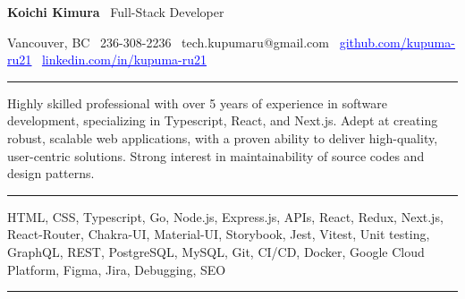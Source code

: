 \documentclass{article}
\newcommand{\link}[2]{\href{#1}{\textcolor{blue}{\uline{#2}}}}
\begin{document}
\begin{center}
    {\LARGE \textbf{Koichi Kimura} \textbar\ \LARGE Full-Stack Developer}
\end{center}
\begin{center}
    Vancouver, BC \textbar\ 236-308-2236 \textbar\ tech.kupumaru@gmail.com \textbar\
    \link{https://github.com/kupuma-ru21}{github.com/kupuma-ru21} \textbar\
    \link{https://www.linkedin.com/in/kupuma-ru21}{linkedin.com/in/kupuma-ru21}
\end{center}

\par
\vspace{-1em}
\noindent\rule{\textwidth}{0.1pt}
\noindent
Highly skilled professional with over 5 years of experience in software development, specializing in Typescript, React, and Next.js. Adept at creating robust, scalable web applications, with a proven ability to deliver high-quality, user-centric solutions. Strong interest in maintainability of source codes and design patterns.

\vspace{1em}

\par
\vspace{-1em}
\noindent\rule{\textwidth}{0.1pt}

\noindent
HTML, CSS, Typescript, Go, Node.js, Express.js, APIs, React, Redux, Next.js, React-Router, Chakra-UI, Material-UI, Storybook, Jest, Vitest, Unit testing, GraphQL, REST, PostgreSQL, MySQL, Git, CI/CD, Docker, Google Cloud Platform, Figma, Jira, Debugging, SEO
\noindent

\vspace{1em}

\par
\vspace{-1em}
\noindent\rule{\textwidth}{0.1pt}
\vspace{0.3em}
\end{document}
